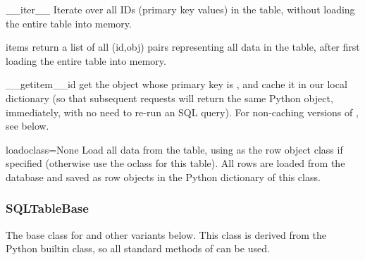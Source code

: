 \documentclass{howto}
\begin{document}
\begin{funcdesc}{__iter__}{}
  Iterate over all IDs (primary key values) in the table,
  without loading the entire table into memory.
\end{funcdesc}

\begin{funcdesc}{items}{}
  return a list of all (id,obj) pairs representing all data in the table,
  after first loading the entire table into memory.
\end{funcdesc}

\begin{funcdesc}{__getitem__}{id}
  get the object whose primary key is , and cache it in
  our local dictionary (so that subsequent requests will return the
  same Python object, immediately, with no need to re-run an SQL query).
  For non-caching versions of , see below.
\end{funcdesc}


\begin{funcdesc}{load}{oclass=None}
  Load all data from the table, using  as the row object
  class if specified (otherwise use the oclass for this table).
  All rows are loaded from the database and saved as row objects
  in the Python dictionary of this class.
\end{funcdesc}

\subsubsection{SQLTableBase}
The base class for  and other variants below.
This class is derived from
the Python builtin  class, so all standard methods of 
can be used.
\end{document}

